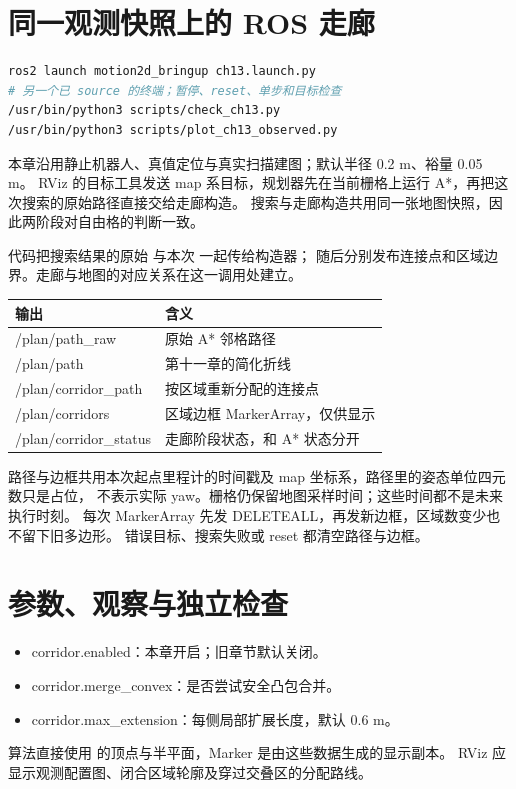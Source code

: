 \section{同一观测快照上的 ROS 走廊}
\begin{lstlisting}[language=bash]
ros2 launch motion2d_bringup ch13.launch.py
# 另一个已 source 的终端；暂停、reset、单步和目标检查
/usr/bin/python3 scripts/check_ch13.py
/usr/bin/python3 scripts/plot_ch13_observed.py
\end{lstlisting}
本章沿用静止机器人、真值定位与真实扫描建图；默认半径 0.2 m、裕量 0.05 m。
RViz 的目标工具发送 map 系目标，规划器先在当前栅格上运行 A*，再把这次搜索的原始路径直接交给走廊构造。
搜索与走廊构造共用同一张地图快照，因此两阶段对自由格的判断一致。
\par\noindent\begin{minipage}{\linewidth}

\end{minipage}\par
代码把搜索结果的原始  与本次  一起传给构造器；
随后分别发布连接点和区域边界。走廊与地图的对应关系在这一调用处建立。

\begin{center}\small
\begin{tabular}{ll}\toprule
输出 & 含义 \\\midrule
/plan/path\_raw & 原始 A* 邻格路径 \\
/plan/path & 第十一章的简化折线 \\
/plan/corridor\_path & 按区域重新分配的连接点 \\
/plan/corridors & 区域边框 MarkerArray，仅供显示 \\
/plan/corridor\_status & 走廊阶段状态，和 A* 状态分开 \\\bottomrule
\end{tabular}
\end{center}
路径与边框共用本次起点里程计的时间戳及 map 坐标系，路径里的姿态单位四元数只是占位，
不表示实际 yaw。栅格仍保留地图采样时间；这些时间都不是未来执行时刻。
每次 MarkerArray 先发 DELETEALL，再发新边框，区域数变少也不留下旧多边形。
错误目标、搜索失败或 reset 都清空路径与边框。

\clearpage
\section{参数、观察与独立检查}
\begin{itemize}
\item corridor.enabled：本章开启；旧章节默认关闭。
\item corridor.merge\_convex：是否尝试安全凸包合并。
\item corridor.max\_extension：每侧局部扩展长度，默认 0.6 m。
\end{itemize}
算法直接使用  的顶点与半平面，Marker 是由这些数据生成的显示副本。
RViz 应显示观测配置图、闭合区域轮廓及穿过交叠区的分配路线。


